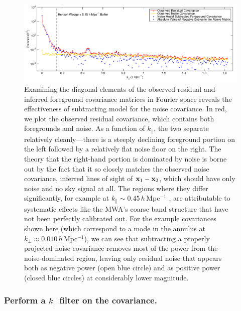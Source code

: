 \begin{figure}[]  
	\centering 
	\includegraphics[width=1\textwidth]{chap4_empirical_covariance/fourier_diagonal.pdf}
	\caption[Examination of the diagonal elements of the observed residual and inferred foreground covariance matrices in Fourier space.]{Examining the diagonal elements of the observed residual and inferred foreground covariance matrices in Fourier space reveals the effectiveness of subtracting model for the noise covariance. In red, we plot the observed residual covariance, which contains both foregrounds and noise. As a function of $k_\|$, the two separate relatively cleanly---there is a steeply declining foreground portion on the left followed by a relatively flat noise floor on the right. The theory that the right-hand portion is dominated by noise is borne out by the fact that it so closely matches the observed noise covariance, inferred lines of sight of $\mathbf{x}_1 - \mathbf{x}_2$, which should have only noise and no sky signal at all. The regions where they differ significantly, for example at $k_\| \sim 0.45$\,$h$\,Mpc$^{-1}$ , are attributable to systematic effects like the MWA's coarse band structure that have not been perfectly calibrated out. For the example covariances shown here (which correspond to a mode in the annulus at $k_\perp \approx 0.010$\,$h$\,Mpc$^{-1}$), we can see that subtracting a properly projected noise covariance removes most of the power from the noise-dominated region, leaving only residual noise that appears both as negative power (open blue circle) and as positive power (closed blue circles) at considerably lower magnitude.}
	\label{fig:fourier_diags}
\end{figure} 
 

\subsubsection{Perform a $k_\|$ filter on the covariance.} \label{sec:filter}

